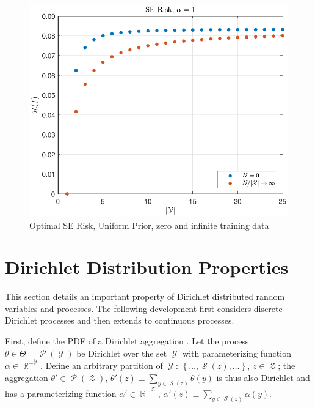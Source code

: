 \documentclass[12pt]{article}
\DeclareMathOperator{\Ycal}{\mathcal{Y}}
\DeclareMathOperator{\Zcal}{\mathcal{Z}}
\DeclareMathOperator{\Scal}{\mathcal{S}}
\DeclareMathOperator{\Pcal}{\mathcal{P}}
\DeclareMathOperator{\Rbb}{\mathbb{R}}
\begin{document}
\begin{figure}
\centering
\includegraphics[scale=1.0]{Risk_SE_uniform_N_lim.pdf}
\caption{Optimal SE Risk, Uniform Prior, zero and infinite training data}
\label{fig:Risk_SE_uniform_N_lim}
\end{figure}











\appendix


\section{Dirichlet Distribution Properties}
\label{app:Dir_agg}

This section details an important property of Dirichlet distributed random variables and processes. The following development first considers discrete Dirichlet processes and then extends to continuous processes. 

First, define the PDF of a Dirichlet aggregation \cite{ferguson}. Let the process $\theta \in \Theta = \Pcal(\Ycal)$ be Dirichlet over the set $\Ycal$ with parameterizing function $\alpha \in {\Rbb^+}^{\Ycal}$. Define an arbitrary partition of $\Ycal$: $\left\{ \ldots,\Scal(z),\ldots \right\}$, $z \in \Zcal$; the aggregation $\theta' \in \Pcal(\Zcal)$, $\theta'(z) \equiv \sum_{y \in \Scal(z)} \theta(y)$ is thus also Dirichlet and has a parameterizing function $\alpha' \in {\Rbb^+}^{\Zcal}$, $\alpha'(z) \equiv \sum_{y \in \Scal(z)} \alpha(y)$.
\end{document}
